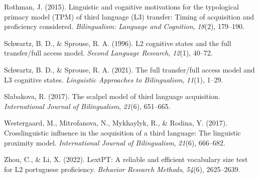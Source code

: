 \documentclass[
  man]{apa6}
\newlength{\cslhangindent}
\newlength{\cslentryspacingunit} %
\newenvironment{CSLReferences}[2] %
 {%
  \setlength{\parindent}{0pt}
  \ifodd #1
  \let\oldpar\par
  \def\par{\hangindent=\cslhangindent\oldpar}
  \fi
  \setlength{\parskip}{#2\cslentryspacingunit}
 }%
 {}
\begin{document}
\begin{CSLReferences}{1}{0}
\leavevmode{}%
Rothman, J. (2015). Linguistic and cognitive motivations for the typological primacy model (TPM) of third language (L3) transfer: Timing of acquisition and proficiency considered. \emph{Bilingualism: Language and Cognition}, \emph{18}(2), 179--190.

\leavevmode{}%
Schwartz, B. D., \& Sprouse, R. A. (1996). L2 cognitive states and the full transfer/full access model. \emph{Second Language Research}, \emph{12}(1), 40--72.

\leavevmode{}%
Schwartz, B. D., \& Sprouse, R. A. (2021). The full transfer/full access model and L3 cognitive states. \emph{Linguistic Approaches to Bilingualism}, \emph{11}(1), 1--29.

\leavevmode{}%
Slabakova, R. (2017). The scalpel model of third language acquisition. \emph{International Journal of Bilingualism}, \emph{21}(6), 651--665.

\leavevmode{}%
Westergaard, M., Mitrofanova, N., Mykhaylyk, R., \& Rodina, Y. (2017). Crosslinguistic influence in the acquisition of a third language: The linguistic proximity model. \emph{International Journal of Bilingualism}, \emph{21}(6), 666--682.

\leavevmode{}%
Zhou, C., \& Li, X. (2022). LextPT: A reliable and efficient vocabulary size test for L2 portuguese proficiency. \emph{Behavior Research Methods}, \emph{54}(6), 2625--2639.

\end{CSLReferences}

\endgroup
\end{document}
